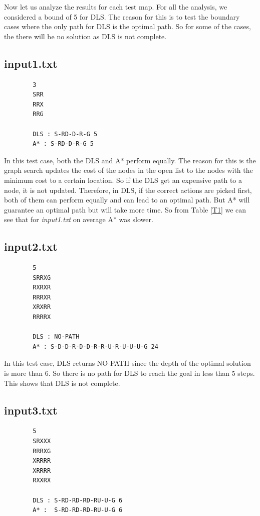 \documentclass{article}
\begin{document}
	Now let us analyze the results for each test map. For all the analysis, we considered a bound of 5 for DLS. The reason for this is to test the boundary cases where the only path for DLS is the optimal path. So for some of the cases, the there will be no solution as DLS is not complete.
	
	\subsection{input1.txt}
		\begin{lstlisting}
		3
		SRR
		RRX
		RRG
		
		DLS : S-RD-D-R-G 5
		A* : S-RD-D-R-G 5
		\end{lstlisting}
		
		In this test case, both the DLS and A* perform equally. The reason for this is the graph search updates the cost of the nodes in the open list to the nodes with the minimum cost to a certain location. So if the DLS get an expensive path to a node, it is not updated. Therefore, in DLS, if the correct actions are picked first, both of them can perform equally and can lead to an optimal path. But A* will guarantee an optimal path but will take more time. So from Table \ref{T1} we can see that for \emph{input1.txt} on average A* was slower.\newline
		
	\newpage
	\subsection{input2.txt}
		\begin{lstlisting}
		5
		SRRXG
		RXRXR
		RRRXR
		XRXRR
		RRRRX
		
		DLS : NO-PATH
		A* : S-D-D-R-D-D-R-R-U-R-U-U-U-G 24
		\end{lstlisting}
		
		In this test case, DLS returns NO-PATH since the depth of the optimal solution is more than 6. So there is no path for DLS to reach the goal in less than 5 steps. This shows that DLS is not complete. \newline
	
	\subsection{input3.txt}	
		\begin{lstlisting}
		5
		SRXXX
		RRRXG
		XRRRR
		XRRRR
		RXXRX
		
		DLS : S-RD-RD-RD-RU-U-G 6
		A* :  S-RD-RD-RD-RU-U-G 6
		\end{lstlisting}
		
\end{document}
